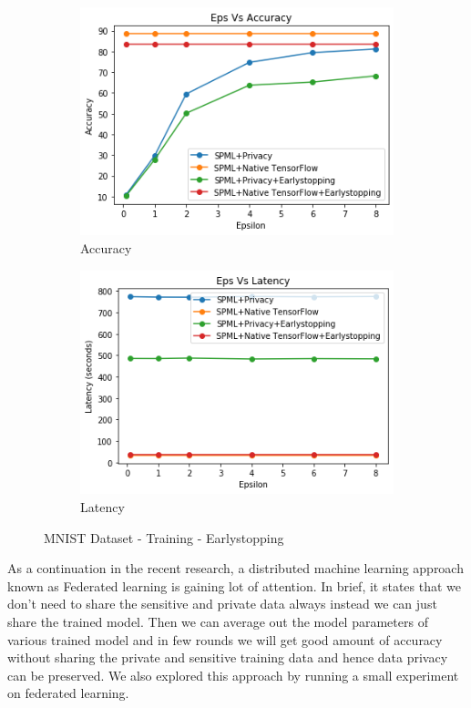 \begin{figure}
     \begin{subfigure}{0.5\textwidth}
         \includegraphics[width=\textwidth]{images/Training/MnistESAccuracy.png}
         \caption{Accuracy}
         \label{fig:EsMnistAccuracyTraining}
     \end{subfigure}
     \begin{subfigure}{0.5\textwidth}
         \includegraphics[width=\textwidth]{images/Training/MnistESLatency.png}
         \caption{Latency}
         \label{fig:EsMnistLatencyTraining}
     \end{subfigure}
        \caption{MNIST Dataset - Training - Earlystopping}
\end{figure}

As a continuation in the recent research, a distributed machine learning approach known as Federated learning \cite{86} is gaining lot of attention. In brief, it states that we don't need to share the sensitive and private data always instead we can just share the trained model. Then we can average out the model parameters of various trained model and in few rounds we will get good amount of accuracy without sharing the private and sensitive training data and hence data privacy can be preserved. We also explored this approach by running a small experiment on federated learning.

